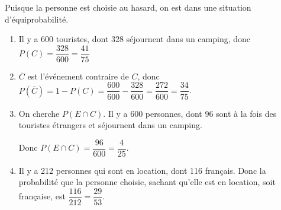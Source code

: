 Puisque la personne est choisie au hasard, on est dans une situation d'équiprobabilité.
\begin{enumerate}
  \item 
  
  Il y a 600 touristes, dont 328 séjournent dans un camping, donc \mbox{$P(C)=\dfrac{328}{600}=\dfrac{41}{75}$}
  \item 
  
  $\overline{C}$ est l’événement contraire de $C$, donc \mbox{$P(\overline{C})=1-P(C)=\dfrac{600}{600}-\dfrac{328}{600}=\dfrac{272}{600}=\dfrac{34}{75}$}.
  \item 
  
  On cherche \mbox{$P(E\cap C)$}. Il y a 600 personnes, dont 96 sont à la fois des touristes étrangers et séjournent dans un camping.
  
  Donc \mbox{$P(E\cap C)=\dfrac{96}{600}=\dfrac{4}{25}$}.
  \item

   Il y a 212 personnes qui sont en location, dont 116 français. Donc la probabilité que la personne choisie, sachant qu'elle est en location, soit française, est \mbox{$\dfrac{116}{212}=\dfrac{29}{53}$}.
\end{enumerate}



